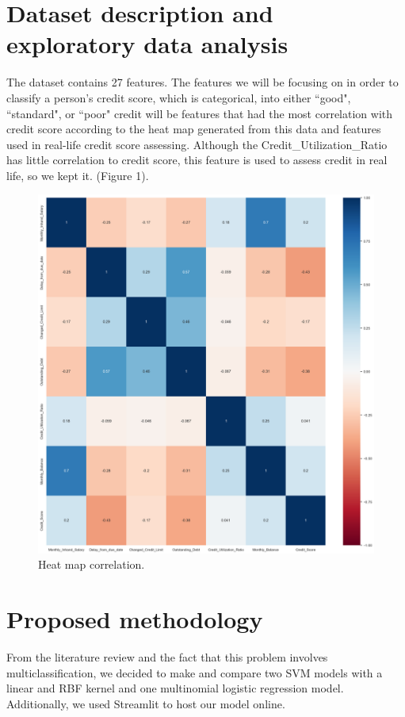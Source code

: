\documentclass[twocolumn]{article}
\begin{document}
\section*{Dataset description and exploratory data analysis}
The dataset contains 27 features. The features we will be focusing on in order
to classify a person's credit score, which is categorical, into either ``good", ``standard", or ``poor" credit
will be features that had the most correlation with credit score according to the heat map
generated from this data and features used in real-life credit score assessing. Although the Credit\_Utilization\_Ratio has little 
correlation to credit score, this feature is used to assess credit in real life, so we kept it. (Figure 1).\\
\begin{figure}[h]
    \includegraphics[width=\columnwidth]{credscoreheatmap.png}
    \caption{Heat map correlation.}
    \label{fig:figure1}
\end{figure}
\section*{Proposed methodology}
From the literature review and the fact that this problem involves multiclassification,
we decided to make and compare two SVM models with a linear and RBF kernel and one 
multinomial logistic regression model. Additionally, we used Streamlit to host our model online.
\end{document}
